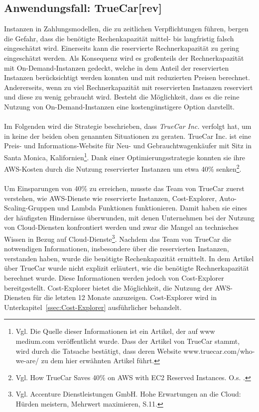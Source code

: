 \subsection{Anwendungsfall: TrueCar[rev]}\label{ssec:UseCaseTrueCar}
Instanzen in Zahlungsmodellen, die zu zeitlichen Verpflichtungen führen, bergen die Gefahr, dass die benötigte Rechenkapazität mittel- bis langfristig falsch eingeschätzt wird. Einerseits kann die reservierte Rechnerkapazität zu gering eingeschätzt werden. Als Konsequenz wird es großenteils der Rechnerkapazität mit On-Demand-Instanzen gedeckt, welche in dem Anteil der reservierten Instanzen berücksichtigt werden konnten und mit reduzierten Preisen berechnet. Andererseits, wenn zu viel Rechnerkapazität mit reservierten Instanzen reserviert und diese zu wenig gebraucht wird. Besteht die Möglichkeit, dass es die reine Nutzung von On-Demand-Instanzen eine kostengünstigere Option darstellt.
\\\\
Im Folgenden wird die Strategie beschrieben, dass \textit{TrueCar Inc.} verfolgt hat, um in keine der beiden oben genannten Situationen zu geraten. TrueCar Inc. ist eine Preis- und Informations-Website für Neu- und Gebrauchtwagenkäufer mit Sitz in Santa Monica, Kalifornien\footnote{Vgl. Die Quelle dieser Informationen ist ein Artikel\cite{MED1}, der auf www medium.com veröffentlicht wurde. Dass der Artikel von TrueCar stammt, wird durch die Tatsache bestätigt, dass deren Website www.truecar.com/who-we-are/ zu dem hier erwähnten Artikel führt.}.
Dank einer Optimierungsstrategie konnten sie ihre AWS-Kosten durch die Nutzung reservierter Instanzen um etwa 40\% senken\footnote{Vgl. How TrueCar Saves 40\% on AWS with EC2 Reserved Instances. O.s. \cite{MED1}.}.
\\\\
Um Einsparungen von 40\% zu erreichen, musste das Team von TrueCar zuerst verstehen, wie AWS-Dienste wie reservierte Instanzen, Cost-Explorer, Auto-Scaling-Gruppen und Lambda Funktionen funktionieren. Damit haben sie eines der häufigsten Hindernisse überwunden, mit denen Unternehmen bei der Nutzung von Cloud-Diensten konfrontiert werden und zwar die Mangel an technisches Wissen in Bezug auf Cloud-Dienste\footnote{Vgl. Accenture Dienstleistungen GmbH. Hohe Erwartungen an die Cloud: Hürden meistern, Mehrwert maximieren, S.11\cite{ACC1}.}. Nachdem das Team von TrueCar die notwendigen Informationen, insbesondere über die reservierten Instanzen, verstanden haben, wurde die benötigte Rechenkapazität ermittelt. In dem Artikel über TrueCar wurde nicht explizit erläutert, wie die benötigte Rechnerkapazität berechnet wurde. Diese Informationen werden jedoch von Cost-Explorer bereitgestellt. Cost-Explorer bietet die Möglichkeit, die Nutzung der AWS-Diensten für die letzten 12 Monate anzuzeigen. Cost-Explorer wird in Unterkapitel~\ref{ssec:Cost-Explorer} ausführlicher behandelt.
